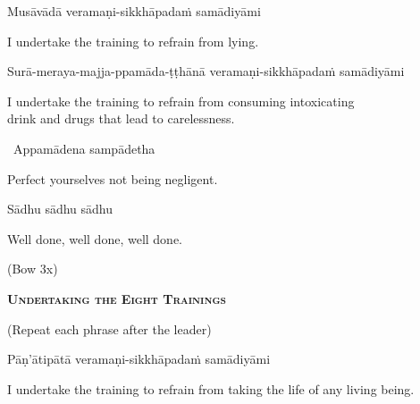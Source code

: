 Musāvādā veramaṇi-sikkhāpadaṁ samādiyāmi

\begin{english}
  I undertake the training to refrain from lying.
\end{english}

\begin{pali-hang}
  Surā-meraya-majja-ppamāda-ṭṭhānā veramaṇi-sikkhāpadaṁ samādiyāmi
\end{pali-hang}

\begin{english-hang}
  I undertake the training to refrain from consuming intoxicating\\
  drink and drugs that lead to carelessness.\makeatletter\hyperlink{endnote140-appendix}\makeatother
\end{english-hang}


\begin{leader-only}
  \anglebracketleft\ \hspace{-0.5mm}Appamādena sampādetha \hspace{-0.5mm}\anglebracketright\
\end{leader-only}

\begin{english}
  Perfect yourselves not being negligent.
\end{english}

Sādhu sādhu sādhu

\begin{english}
  Well done, well done, well done.
\end{english}

\begin{center}
  (Bow 3x)
\end{center}

\clearpage

\begin{center}
  \textbf{\textsc{Undertaking the Eight Trainings}}
\end{center}

\begin{center}
  (Repeat each phrase after the leader)
\end{center}

Pāṇ'ātipātā veramaṇi-sikkhāpadaṁ samādiyāmi

\begin{english-hang}
  I undertake the training to refrain from taking the life of any living being.
\end{english-hang}

